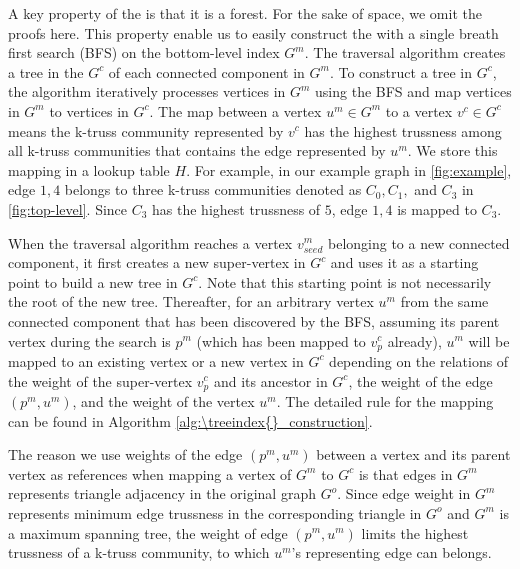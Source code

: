 A key property of the \treeindex{} is that it is a forest. For the sake of space, we omit the proofs here. This property enable us to easily construct the \treeindex{} with a single breath first search (BFS) on the bottom-level index $G^m$. The traversal algorithm creates a tree in the \treeindex{} $G^c$ of each connected component in $G^m$. To construct a tree in $G^c$, the algorithm iteratively processes vertices in $G^m$ using the BFS and map vertices in $G^m$ to vertices in $G^c$. The map between a vertex $u^m \in G^m$ to a vertex $v^c \in G^c$ means the k-truss community represented by $v^c$ has the highest trussness among all k-truss communities that contains the edge represented by $u^m$. We store this mapping in a lookup table $H$. For example, in our example graph in \autoref{fig:example}, edge $1,4$ belongs to three k-truss communities denoted as $C_{0}, C_{1},$ and $C_{3}$ in \autoref{fig:top-level}. Since $C_{3}$ has the highest trussness of $5$, edge $1,4$ is mapped to $C_{3}$.

When the traversal algorithm reaches a vertex $v^{m}_{seed}$ belonging to a new connected component, it first creates a new super-vertex in $G^c$ and uses it as a starting point to build a new tree in $G^c$. Note that this starting point is not necessarily the root of the new tree. Thereafter, for an arbitrary vertex $u^m$ from the same connected component that has been discovered by the BFS, assuming its parent vertex during the search is $p^m$ (which has been mapped to $v^{c}_{p}$ already), $u^m$ will be mapped to an existing vertex or a new vertex in $G^c$ depending on the relations of the weight of the super-vertex $v^{c}_{p}$ and its ancestor in $G^c$, the weight of the edge $(p^m, u^m)$, and the weight of the vertex $u^m$. The detailed rule for the mapping can be found in Algorithm \ref{alg:\treeindex{}_construction}.

The reason we use weights of the edge $(p^m, u^m)$ between a vertex and its parent vertex as references when mapping a vertex of $G^m$ to $G^c$ is that edges in $G^m$ represents triangle adjacency in the original graph $G^o$. Since edge weight in $G^m$ represents minimum edge trussness in the corresponding triangle in $G^o$ and $G^m$ is a maximum spanning tree, the weight of edge $(p^m, u^m)$ limits the highest trussness of a k-truss community, to which $u^m$'s representing edge can belongs. 


